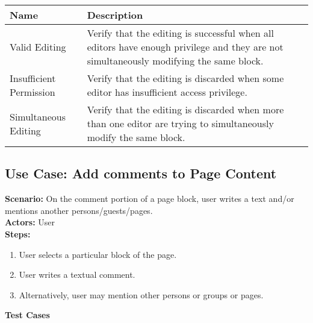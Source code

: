 \documentclass{article}
\begin{document}
            \begin{longtable}{|p{}|p{}|}
            \hline
            \textbf{Name} & \textbf{Description} \\
            \hline
            Valid Editing & Verify that the editing is successful when all editors have enough privilege and they are not simultaneously modifying the same block. \\
\hline
Insufficient Permission & Verify that the editing is discarded when some editor has insufficient access privilege. \\
\hline
Simultaneous Editing & Verify that the editing is discarded when more than one editor are trying to simultaneously modify the same block. \\
\hline
\end{longtable}\subsection{\textbf{Use Case: Add comments to Page Content}}
\textbf{Scenario:} On the comment portion of a page block, user writes a text and/or mentions another persons/guests/pages.\\
\textbf{Actors:} User\\
\textbf{Steps:}
\begin{enumerate}
\item User selects a particular block of the page.
\item User writes a textual comment.
\item Alternatively, user may mention other persons or groups or pages.
\end{enumerate}
\textbf{Test Cases}
\end{document}
